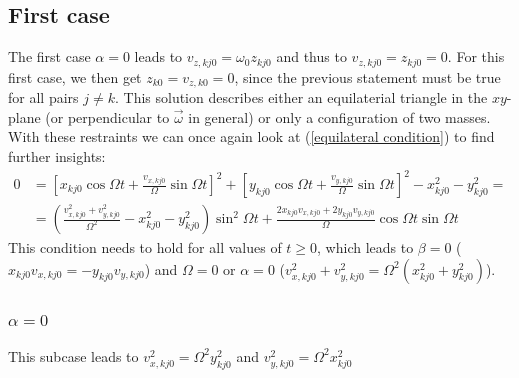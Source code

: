 \documentclass[a4paper,12pt]{article}
\newcommand{\kla}{}
\newcommand{\klam}{}
\begin{document}
\subsection{First case}
The first case $\alpha=0$ leads to $v_{z,kj0}=\omega_0z_{kj0}$ and thus to $v_{z,kj0}=z_{kj0}=0$. For this first case, we then get $z_{k0}=v_{z,k0}=0$, since the previous statement must be true for all pairs $j\neq k$. This solution describes either an equilaterial triangle in the $xy$-plane (or perpendicular to $\vec{\omega}$ in general) or only a configuration of two masses. With these restraints we can once again look at (\ref{equilateral condition}) to find further insights:
\begin{align*}
0&=\klam\left[ {x_{kj0}\cos\Omega t+\frac{v_{x,kj0}}{\Omega}\sin\Omega t} \right]^2+\klam\left[ {y_{kj0}\cos\Omega t+\frac{v_{y,kj0}}{\Omega}\sin\Omega t} \right]^2-x_{kj0}^2-y_{kj0}^2=\\
&=\kla\left( {\frac{v_{x,kj0}^2+v_{y,kj0}^2}{\Omega^2}-x_{kj0}^2-y_{kj0}^2} \right)\sin^2\Omega t+\frac{2x_{kj0}v_{x,kj0}+2y_{kj0}v_{y,kj0}}{\Omega}\cos\Omega t\sin\Omega t
\end{align*}
This condition needs to hold for all values of $t\ge 0$, which leads to $\beta=0$ ($x_{kj0}v_{x,kj0}=-y_{kj0}v_{y,kj0}$) and $\Omega=0$ or $\alpha=0$ ($v_{x,kj0}^2+v_{y,kj0}^2=\Omega^2(x_{kj0}^2+y_{kj0}^2)$).
\subsubsection{$\alpha=0$}
This subcase leads to $v_{x,kj0}^2=\Omega^2y_{kj0}^2$ and $v_{y,kj0}^2=\Omega^2x_{kj0}^2$ 
\end{document}
